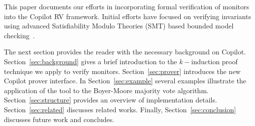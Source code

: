                                      
This paper documents our efforts in incorporating formal verification
of monitors into the Copilot RV framework.  Initial efforts have
focused on verifying invariants using advanced Satisfiability Modulo
Theories (SMT) based bounded model
checking~\cite{ClarkeBounded01}.  




The next section provides the reader with the necessary background on
Copilot. Section~\ref{sec:background} gives a brief introduction to
the $k-$induction proof technique we apply to verify
monitors. Section~\ref{sec:prover} introduces the new Copilot prover
interface. In Section~\ref{sec:example} several examples illustrate
the application of the tool to the Boyer-Moore majority vote
algorithm. Section~\ref{sec:structure} provides an overview of
implementation details. Section~\ref{sec:related} discusses related
works. Finally, Section~\ref{sec:conclusion}
discusses future work and concludes.



  







